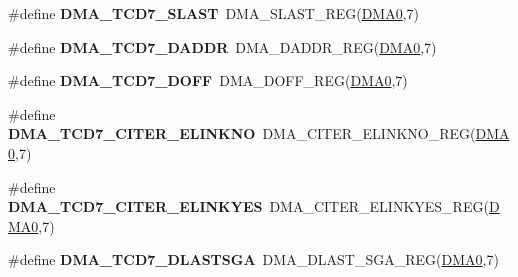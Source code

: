 \begin{DoxyCompactItemize}
\item 
\#define {\bfseries D\+M\+A\+\_\+\+T\+C\+D7\+\_\+\+S\+L\+A\+ST}~D\+M\+A\+\_\+\+S\+L\+A\+S\+T\+\_\+\+R\+EG(\hyperlink{group__DMA__Peripheral__Access__Layer_ga4103044f9ca209772f513dc694513ffb}{D\+M\+A0},7)\hypertarget{group__DMA__Register__Accessor__Macros_ga5c071968c6d2421889098ea4f55c68e0}{}\label{group__DMA__Register__Accessor__Macros_ga5c071968c6d2421889098ea4f55c68e0}

\item 
\#define {\bfseries D\+M\+A\+\_\+\+T\+C\+D7\+\_\+\+D\+A\+D\+DR}~D\+M\+A\+\_\+\+D\+A\+D\+D\+R\+\_\+\+R\+EG(\hyperlink{group__DMA__Peripheral__Access__Layer_ga4103044f9ca209772f513dc694513ffb}{D\+M\+A0},7)\hypertarget{group__DMA__Register__Accessor__Macros_ga1a521a7dfdbf6626ffcaaccaca1eed27}{}\label{group__DMA__Register__Accessor__Macros_ga1a521a7dfdbf6626ffcaaccaca1eed27}

\item 
\#define {\bfseries D\+M\+A\+\_\+\+T\+C\+D7\+\_\+\+D\+O\+FF}~D\+M\+A\+\_\+\+D\+O\+F\+F\+\_\+\+R\+EG(\hyperlink{group__DMA__Peripheral__Access__Layer_ga4103044f9ca209772f513dc694513ffb}{D\+M\+A0},7)\hypertarget{group__DMA__Register__Accessor__Macros_ga51be79805d416f10b5705f324a660b5c}{}\label{group__DMA__Register__Accessor__Macros_ga51be79805d416f10b5705f324a660b5c}

\item 
\#define {\bfseries D\+M\+A\+\_\+\+T\+C\+D7\+\_\+\+C\+I\+T\+E\+R\+\_\+\+E\+L\+I\+N\+K\+NO}~D\+M\+A\+\_\+\+C\+I\+T\+E\+R\+\_\+\+E\+L\+I\+N\+K\+N\+O\+\_\+\+R\+EG(\hyperlink{group__DMA__Peripheral__Access__Layer_ga4103044f9ca209772f513dc694513ffb}{D\+M\+A0},7)\hypertarget{group__DMA__Register__Accessor__Macros_ga031018c1c2650eee7cf7606861bf9fba}{}\label{group__DMA__Register__Accessor__Macros_ga031018c1c2650eee7cf7606861bf9fba}

\item 
\#define {\bfseries D\+M\+A\+\_\+\+T\+C\+D7\+\_\+\+C\+I\+T\+E\+R\+\_\+\+E\+L\+I\+N\+K\+Y\+ES}~D\+M\+A\+\_\+\+C\+I\+T\+E\+R\+\_\+\+E\+L\+I\+N\+K\+Y\+E\+S\+\_\+\+R\+EG(\hyperlink{group__DMA__Peripheral__Access__Layer_ga4103044f9ca209772f513dc694513ffb}{D\+M\+A0},7)\hypertarget{group__DMA__Register__Accessor__Macros_ga7595d3fc88edbc275e9f21568d55e382}{}\label{group__DMA__Register__Accessor__Macros_ga7595d3fc88edbc275e9f21568d55e382}

\item 
\#define {\bfseries D\+M\+A\+\_\+\+T\+C\+D7\+\_\+\+D\+L\+A\+S\+T\+S\+GA}~D\+M\+A\+\_\+\+D\+L\+A\+S\+T\+\_\+\+S\+G\+A\+\_\+\+R\+EG(\hyperlink{group__DMA__Peripheral__Access__Layer_ga4103044f9ca209772f513dc694513ffb}{D\+M\+A0},7)\hypertarget{group__DMA__Register__Accessor__Macros_ga23e818dc306809fc9a3a2b7e46a69ef0}{}\label{group__DMA__Register__Accessor__Macros_ga23e818dc306809fc9a3a2b7e46a69ef0}


\end{DoxyCompactItemize}

